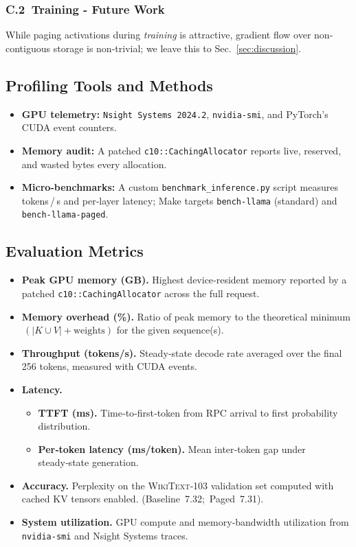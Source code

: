 \documentclass[conference]{IEEEtran}
\begin{document}
\subsubsection*{C.2~Training - Future Work}
While paging activations during \emph{training} is attractive, gradient flow over non-contiguous storage is non-trivial; we leave this to Sec.~\ref{sec:discussion}.

\vspace{-0.4em}
\subsection{Profiling Tools and Methods}\label{subsec:profiling}
\begin{itemize}[leftmargin=*]
  \raggedright
  \item \textbf{GPU telemetry:} \texttt{Nsight Systems 2024.2}, \texttt{nvidia-smi}, and PyTorch's CUDA event counters.
  \item \textbf{Memory audit:} A patched \texttt{c10::CachingAllocator} reports live, reserved, and wasted bytes every allocation.
  \item \textbf{Micro-benchmarks:} A custom \verb|benchmark_inference.py| script measures tokens / s and per‑layer latency; Make targets \verb|bench-llama| (standard) and \verb|bench-llama-paged|.
\end{itemize}

\vspace{-0.4em}
\subsection{Evaluation Metrics}\label{subsec:metrics}
\begin{itemize}[leftmargin=*,labelsep=0.5em]
  \raggedright
  \item \textbf{Peak GPU memory (GB).}  Highest device‑resident memory reported by a patched \texttt{c10::CachingAllocator} across the full request.
  \item \textbf{Memory overhead (\%).}  Ratio of peak memory to the theoretical minimum $\,(\lvert\!K\! \cup\! V\rvert + \text{weights})$ for the given sequence(s).
  \item \textbf{Throughput (tokens/s).}  Steady‑state decode rate averaged over the final 256 tokens, measured with CUDA events.
  \item \textbf{Latency.}
    \begin{itemize}[leftmargin=1.2em]
      \item \textbf{TTFT (ms).}  Time‑to‑first‑token from RPC arrival to first probability distribution.
      \item \textbf{Per‑token latency (ms/token).}  Mean inter‑token gap under steady‑state generation.
    \end{itemize}
  \item \textbf{Accuracy.}  Perplexity on the \textsc{WikiText‑103} validation set computed with cached KV tensors enabled. (Baseline 7.32; Paged 7.31).
  \item \textbf{System utilization.}  GPU compute and memory‑bandwidth utilization from \texttt{nvidia‑smi} and Nsight Systems traces.
\end{itemize}
\end{document}
